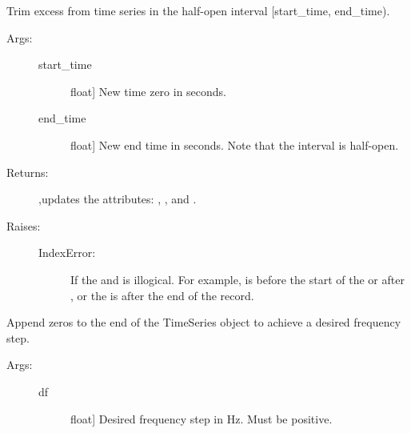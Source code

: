 \documentclass[letterpaper,10pt,english,openany,oneside]{sphinxmanual}
\begin{document}
\begin{fulllineitems}
\begin{fulllineitems}
\end{fulllineitems}


\begin{fulllineitems}
\label{\detokenize{index:sigpropy.TimeSeries.trim}}
Trim excess from time series in the half-open interval
{[}start\_time, end\_time).
\begin{description}
\item[{Args:}] \leavevmode\begin{description}
\item[{start\_time}] \leavevmode{[}float{]}
New time zero in seconds.

\item[{end\_time}] \leavevmode{[}float{]}
New end time in seconds. Note that the interval is
half-open.

\end{description}

\item[{Returns:}] \leavevmode
{},updates the attributes: , , and
.

\item[{Raises:}] \leavevmode\begin{description}
\item[{IndexError:}] \leavevmode
If the  and  is illogical.
For example,  is before the start of the
 or after , or the  is
after the end of the record.

\end{description}

\end{description}

\end{fulllineitems}


\begin{fulllineitems}
\label{\detokenize{index:sigpropy.TimeSeries.zero_pad}}
Append zeros to the end of the TimeSeries object to achieve a
desired frequency step.
\begin{description}
\item[{Args:}] \leavevmode\begin{description}
\item[{df}] \leavevmode{[}float{]}
Desired frequency step in Hz. Must be positive.


\end{description}
\end{description}
\end{fulllineitems}
\end{fulllineitems}
\end{document}
